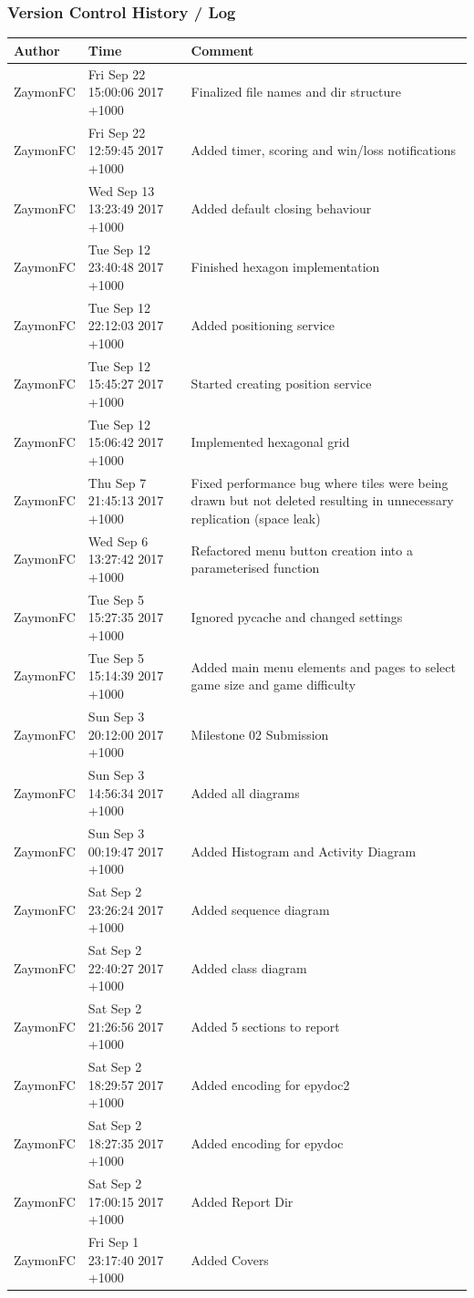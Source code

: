 \documentclass[12pt, a4]{report}
\begin{document}
\subsubsection{Version Control History / Log}
\begin{table}[!h]
	\begin{tabular}{ll p{7cm}}
	Author				  & Time   			& Comment \\ \hline
	ZaymonFC & Fri Sep 22 15:00:06 2017 +1000 & Finalized file names and dir structure \\
	ZaymonFC & Fri Sep 22 12:59:45 2017 +1000 & Added timer, scoring and win/loss notifications \\
	ZaymonFC & Wed Sep 13 13:23:49 2017 +1000 & Added default closing behaviour \\
	ZaymonFC & Tue Sep 12 23:40:48 2017 +1000 & Finished hexagon implementation \\
	ZaymonFC & Tue Sep 12 22:12:03 2017 +1000 & Added positioning service \\
	ZaymonFC & Tue Sep 12 15:45:27 2017 +1000 & Started creating position service \\
	ZaymonFC & Tue Sep 12 15:06:42 2017 +1000 & Implemented hexagonal grid \\
	ZaymonFC & Thu Sep 7 21:45:13 2017 +1000 &  Fixed performance bug where tiles were being drawn but not deleted resulting in unnecessary replication (space leak) \\
	ZaymonFC & Wed Sep 6 13:27:42 2017 +1000 &  Refactored menu button creation into a parameterised function \\
	ZaymonFC & Tue Sep 5 15:27:35 2017 +1000 &  Ignored pycache and changed settings \\
	ZaymonFC & Tue Sep 5 15:14:39 2017 +1000 &  Added main menu elements and pages to select game size and game difficulty \\
	ZaymonFC & Sun Sep 3 20:12:00 2017 +1000 &  Milestone 02 Submission \\
	ZaymonFC & Sun Sep 3 14:56:34 2017 +1000 &  Added all diagrams \\
	ZaymonFC & Sun Sep 3 00:19:47 2017 +1000 &  Added Histogram and Activity Diagram \\
	ZaymonFC & Sat Sep 2 23:26:24 2017 +1000 &  Added sequence diagram \\
	ZaymonFC & Sat Sep 2 22:40:27 2017 +1000 &  Added class diagram \\
	ZaymonFC & Sat Sep 2 21:26:56 2017 +1000 &  Added 5 sections to report \\
	ZaymonFC & Sat Sep 2 18:29:57 2017 +1000 &  Added encoding for epydoc2 \\
	ZaymonFC & Sat Sep 2 18:27:35 2017 +1000 &  Added encoding for epydoc \\
	ZaymonFC & Sat Sep 2 17:00:15 2017 +1000 &  Added Report Dir \\
	ZaymonFC & Fri Sep 1 23:17:40 2017 +1000 &  Added Covers
	
	
	\end{tabular}
	\end{table}
	
\end{document}
